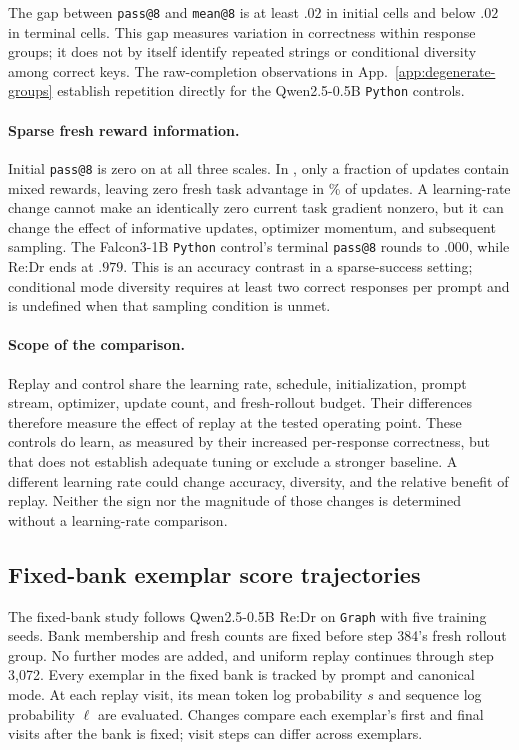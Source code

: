 \documentclass{article}
\newcommand{\1}{\mathbf 1}
\theoremstyle{remark}
\theoremstyle{definition}
\theoremstyle{plain}
\begin{document}
The gap between \texttt{pass@8} and \texttt{mean@8} is at least $.02$ in
\MDctlOpened{} initial cells and below $.02$ in \MDctlClosed{} terminal
cells. This gap measures variation in correctness within response groups;
it does not by itself identify repeated strings or conditional diversity
among correct keys. The raw-completion observations in
App.~\ref{app:degenerate-groups} establish repetition directly for the
Qwen2.5-0.5B \texttt{Python} controls.

\paragraph{Sparse fresh reward information.}
Initial \texttt{pass@8} is zero on \MDctlZeroBaseDomain{} at all three
scales. In \MDctlLeanestCell{}, only a fraction \MDctlLeanestMixed{} of
updates contain mixed rewards, leaving zero fresh task advantage in
\MDctlLeanestZero{}\% of updates. A learning-rate change cannot make an
identically zero current task gradient nonzero, but it can change the effect
of informative updates, optimizer momentum, and subsequent sampling.
The Falcon3-1B \texttt{Python} control's terminal \texttt{pass@8} rounds to $.000$, while Re:Dr
ends at $.979$. This is an accuracy contrast in a sparse-success setting;
conditional mode diversity requires at least two correct responses per
prompt and is undefined when that sampling condition is unmet.

\paragraph{Scope of the comparison.}
Replay and control share the learning rate, schedule, initialization,
prompt stream, optimizer, update count, and fresh-rollout budget.
Their differences therefore measure the effect of replay at the tested
operating point. These controls do learn, as measured by their increased
per-response correctness, but that does not establish adequate tuning or
exclude a stronger baseline. A different learning rate could change accuracy,
diversity, and the relative benefit of replay. Neither the sign nor the
magnitude of those changes is determined without a learning-rate comparison.

\subsection{Fixed-bank exemplar score trajectories}
\label{app:fixed-bank-survival}

The fixed-bank study follows Qwen2.5-0.5B Re:Dr on \texttt{Graph} with five
training seeds. Bank membership and fresh counts are fixed before step 384's
fresh rollout group. No further modes are added, and uniform replay
continues through step 3,072. Every exemplar in the fixed bank is tracked
by prompt and canonical mode. At each replay visit, its mean token log
probability $s$ and sequence log probability $\ell$ are evaluated.
Changes compare each exemplar's first and final visits after the bank is
fixed; visit steps can differ across exemplars.
\end{document}
